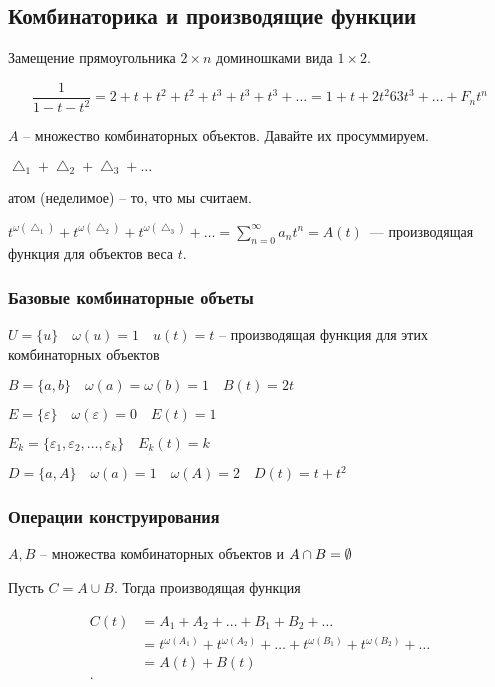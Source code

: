 \subsection{Комбинаторика и производящие функции}

\begin{example}
Замещение прямоугольника $2 \times n$ доминошками вида $1 \times 2$.

\[\frac{1}{1 - t - t^2} = 2 + t + t^2 + t^2 + t^3 + t^3 + t^3 + \ldots = 1 + t + 2t^2 6 3t^3 + \ldots + F_n t^n\]
\end{example}

\begin{example}
    $A$ -- множество комбинаторных объектов. Давайте их просуммируем.

    $\bigtriangleup_1 + \bigtriangleup_2 + \bigtriangleup_3 + \dots$

    атом (неделимое) -- то, что мы считаем.

    $t^{\omega(\bigtriangleup_1)} + t^{\omega(\bigtriangleup_2)} + t^{\omega(\bigtriangleup_3)} + \ldots
    = \sum_{n=0}^\infty a_n t^n = A(t)$~--- производящая функция для объектов веса $t$.
\end{example}

\subsubsection*{Базовые комбинаторные объеты}

\begin{definition}

    $U = \{ u \}\quad \omega(u) = 1\quad u(t) = t$ -- производящая функция для этих комбинаторных объектов

    $B = \{a, b\}\quad \omega(a) = \omega(b) = 1\quad B(t) = 2t$

    $E = \{\varepsilon\}\quad \omega(\varepsilon) = 0\quad E(t) = 1$

    $E_k = \{\varepsilon_1, \varepsilon_2, \ldots, \varepsilon_k\}\quad E_k(t) = k$

    $D = \{a, A\}\quad \omega(a) = 1\quad \omega(A) = 2\quad D(t) = t + t^2$
\end{definition}

\subsubsection*{Операции конструирования}
\begin{definition}

    $A, B$ -- множества комбинаторных объектов и $A\cap B = \emptyset $

    Пусть $C = A\cup B$. Тогда производящая функция 

    \begin{align*}
    C(t) &= A_1 + A_2 + \ldots + B_1 + B_2 + \ldots \\
        &= t^{\omega(A_1)} + t^{\omega(A_2)} + \ldots + t^{\omega(B_1)} + t^{\omega(B_2)} + \ldots \\
        &= A(t) + B(t) \\
    .\end{align*}
\end{definition}


